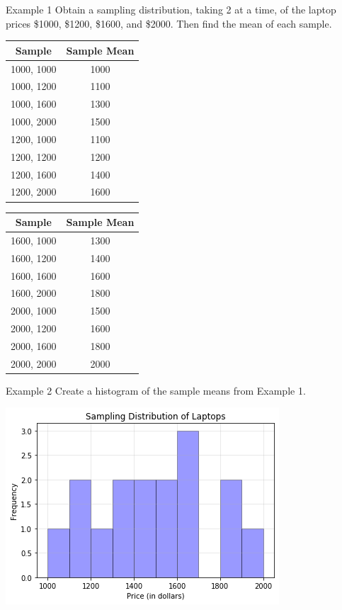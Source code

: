 \documentclass[t]{beamer}
\begin{document}
\begin{frame}{Example 1}
Obtain a sampling distribution, taking 2 at a time, of the laptop prices \$1000, \$1200, \$1600, and \$2000. Then find the mean of each sample.	\newline\\	\pause
\begin{minipage}{0.4\textwidth}
\begin{tabular}{c|c}
Sample & Sample Mean \\ \hline
1000, 1000 & 1000 \\
1000, 1200 & 1100 \\
1000, 1600 & 1300 \\
1000, 2000 & 1500 \\
1200, 1000 & 1100 \\
1200, 1200 & 1200 \\
1200, 1600 & 1400 \\
1200, 2000 & 1600 \\
\end{tabular}
\end{minipage}
\hspace{0.5cm}
\begin{minipage}{0.4\textwidth}
\begin{tabular}{c|c}
Sample & Sample Mean \\ \hline
1600, 1000 & 1300 \\
1600, 1200 & 1400 \\
1600, 1600 & 1600 \\
1600, 2000 & 1800 \\
2000, 1000 & 1500 \\
2000, 1200 & 1600 \\
2000, 1600 & 1800 \\
2000, 2000 & 2000 \\
\end{tabular}
\end{minipage}
\end{frame}

\begin{frame}{Example 2}
Create a histogram of the sample means from Example 1.	\newline\\	\pause
\begin{center}
\includegraphics[scale=0.6]{../Images/sampling_hist_01.png}
\end{center}
\end{frame}
\end{document}
